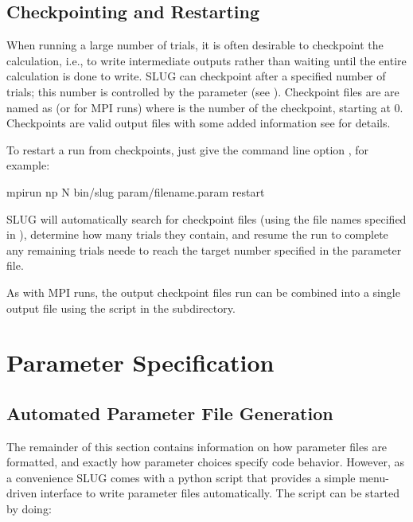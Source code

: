\documentclass[letterpaper,10pt,english]{sphinxmanual}
\begin{document}
\section{Checkpointing and Restarting}
\label{\detokenize{running:checkpointing-and-restarting}}
When running a large number of trials, it is often desirable to checkpoint the calculation, i.e., to write intermediate outputs rather than waiting until the entire calculation is done to write. SLUG can checkpoint after a specified number of trials; this number is controlled by the  parameter (see {\hyperref[\detokenize{parameters:sec-parameters}]{}}). Checkpoint files are are named as  (or  for MPI runs) where  is the number of the checkpoint, starting at 0. Checkpoints are valid output files with some added information \textendash{} see {\hyperref[\detokenize{output:ssec-checkpoint-files}]{}} for details.

To restart a run from checkpoints, just give the command line option , for example:

\begin{sphinxVerbatim}[commandchars=\\\{\}]
mpirun \PYGZhy{}np N bin/slug param/filename.param \PYGZhy{}\PYGZhy{}restart
\end{sphinxVerbatim}

SLUG will automatically search for checkpoint files (using the file names specified in ), determine how many trials they contain, and resume the run to complete any remaining trials neede to reach the target number specified in the parameter file.

As with MPI runs, the output checkpoint files run can be combined into a single output file using the  script in the  subdirectory.


\chapter{Parameter Specification}
\label{\detokenize{parameters:sec-parameters}}\label{\detokenize{parameters::doc}}\label{\detokenize{parameters:parameter-specification}}

\section{Automated Parameter File Generation}
\label{\detokenize{parameters:automated-parameter-file-generation}}
The remainder of this section contains information on how parameter files are formatted, and exactly how parameter choices specify code behavior. However, as a convenience SLUG comes with a python script that provides a simple menu-driven interface to write parameter files automatically. The script can be started by doing:
\end{document}
